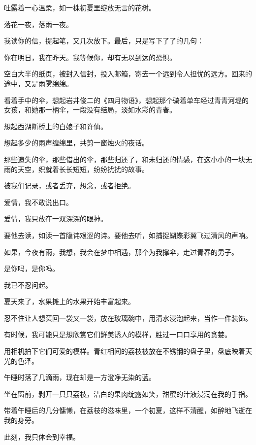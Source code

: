 		吐露着一心温柔，如一株初夏里绽放无言的花树。\par
		落花一夜，落雨一夜。\par
		我读你的信，提起笔，又几次放下。最后，只是写下了了的几句：

		你在明日，我在昨天。我等候你，却有无以到达的恐惧。

		空白大半的纸页，被封入信封，投入邮箱，寄去一个远到令人担忧的远方。回来的途中，又是雨雾绵绵。\par
		看着手中的伞，想起岩井俊二的《四月物语》，想起那个骑着单车经过青青河堤的女孩，和她那一柄伞，一段没有结局，淡如水彩的青春。\par
		想起西湖断桥上的白娘子和许仙。\par
		想起多少的雨声缠绵里，共剪一窗烛火的夜话。\par
		那些遗失的伞，那些借出的伞，那些归还了，和未归还的情感，在这小小的一块无雨的天空，织就着长长短短，纷纷扰扰的故事。\par
		被我们记录，或者丢弃，想念，或者拒绝。

		爱情，我不敢说出口。\par
		爱情，我只放在一双深深的眼神。\par
		要他去读，如读一首隐讳艰涩的诗。要他去听，如捕捉蝴蝶彩翼飞过清风的声响。

		如果，今夜有雨，我想，我会在梦中相遇，那个为我撑伞，走过青春的男子。\par
		是你吗，是你吗。\par
		我已不忍问起。

	\endwriting



		夏天来了，水果摊上的水果开始丰富起来。\par
		忍不住让人想买回一袋又一袋，放在玻璃碗中，用清水浸泡起来，当作一件装饰。\par
		有时候，我可能只是想欣赏它们鲜美诱人的模样，胜过一口口享用的贪婪。

		\vspace{1em}
		用相机拍下它们可爱的模样。青红相间的荔枝被放在不锈钢的盘子里，盘底映着天光的色泽。\par
		午睡时落了几滴雨，现在却是一方澄净无染的蓝。\par
		坐在窗前，剥开一只只荔枝，洁白的果肉绽露如笑，甜蜜的汁液浸润在我的手指。\par
		带着午睡后的几分慵懒，在荔枝的滋味里，一个初夏，这样不清醒，如醉地飞逝在我的身旁。\par
		此刻，我只体会到幸福。

